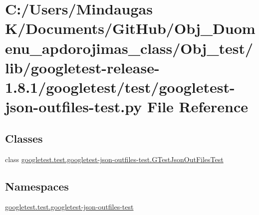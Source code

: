 \hypertarget{_obj__test_2lib_2googletest-release-1_88_81_2googletest_2test_2googletest-json-outfiles-test_8py}{}\section{C\+:/\+Users/\+Mindaugas K/\+Documents/\+Git\+Hub/\+Obj\+\_\+\+Duomenu\+\_\+apdorojimas\+\_\+class/\+Obj\+\_\+test/lib/googletest-\/release-\/1.8.1/googletest/test/googletest-\/json-\/outfiles-\/test.py File Reference}
\label{_obj__test_2lib_2googletest-release-1_88_81_2googletest_2test_2googletest-json-outfiles-test_8py}
\subsection*{Classes}
\begin{DoxyCompactItemize}
\item 
class \mbox{\hyperlink{classgoogletest_1_1test_1_1googletest-json-outfiles-test_1_1_g_test_json_out_files_test}{googletest.\+test.\+googletest-\/json-\/outfiles-\/test.\+G\+Test\+Json\+Out\+Files\+Test}}
\end{DoxyCompactItemize}
\subsection*{Namespaces}
\begin{DoxyCompactItemize}
\item 
 \mbox{\hyperlink{namespacegoogletest_1_1test_1_1googletest-json-outfiles-test}{googletest.\+test.\+googletest-\/json-\/outfiles-\/test}}
\end{DoxyCompactItemize}
